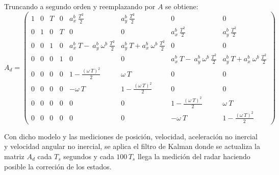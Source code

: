 	Truncando a segundo orden y reemplazando por $A$ se obtiene:
		\begin{equation*}
			A_d = \begin{pmatrix}	1&0&T&0&a^b_x\:\frac{T^2}{2}&a^b_y\:\frac{T^2}{2}&0&0\\[0.3em]%
						0&1&0&T&0&0&a^b_x\:\frac{T^2}{2}&a^b_y\:\frac{T^2}{2}\\[0.3em]%
						0&0&1&0&a^b_x\:T-\:a^b_y\:\omega^b\:\frac{T^2}{2}&a^b_y\: T+a^b_x\:\omega^b\:\frac{T^2}{2}&0&0\\[0.3em]%
						0&0&0&1&0&0&a^b_x\:T-\:a^b_y\:\omega^b\:\frac{T^2}{2}&a^b_y\: T+a^b_x\:\omega^b\:\frac{T^2}{2}\\[0.3em]%
						0&0&0&0&1-\frac{(\omega\:T)^2}{2}&\omega\:T&0&0\\[0.3em]%
						0&0&0&0&-\omega\:T&1-\frac{(\omega\:T)^2}{2}&0&0\\[0.3em]%
						0&0&0&0&0&0&1-\frac{(\omega\:T)^2}{2}&\omega\:T\\[0.3em]%
						0&0&0&0&0&0&-\omega\:T&1-\frac{(\omega\:T)^2}{2}
		\end{pmatrix}
		\end{equation*}


		Con dicho modelo y las mediciones de posición, velocidad, aceleración no inercial y velocidad angular no inercial, se aplica el filtro de Kalman donde se actualiza la matriz $A_d$ cada $T_s$ segundos y cada $100\, T_s$ llega la medición del radar haciendo posible la correción de los estados.
	
%
%	
